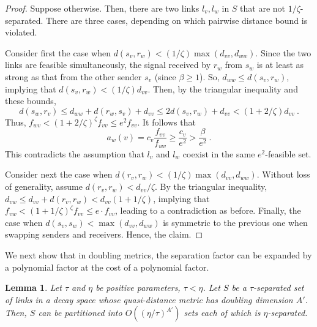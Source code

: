 \documentclass[11pt]{amsart}
\newtheorem{lemma}{Lemma}[section]
\begin{document}
\begin{proof}
Suppose otherwise. Then, there are two links $l_v,l_w$ in 
$S$ that are not $1/\zeta$-separated.
There are three cases, depending on which pairwise distance bound is violated.

Consider first the case when $d(s_v,r_w) < (1/\zeta)
\max(d_{vv},d_{ww})$.  Since the two links are feasible
simultaneously, the signal received by $r_w$ from $s_w$ is at least as
strong as that from the other sender $s_v$ (since $\beta \ge 1$).
So, $d_{ww} \le d(s_v,r_w)$, implying that 
$d(s_v,r_w) < (1/\zeta) d_{vv}$.
Then, by the triangular inequality and these bounds, 
\[ d(s_w,r_v) \le d_{ww} + d(r_w,s_v) + d_{vv} \le 2d(s_v,r_w)+d_{vv}
    < (1 + 2/\zeta)d_{vv}\ . \]
Thus, $f_{wv} < (1+2/\zeta)^\zeta f_{vv} \le e^2 f_{vv}$.
It follows that
 \[ a_w(v) = c_v \frac{f_{vv}}{f_{wv}} \ge \frac{c_v}{e^2} > \frac{\beta}{e^2}\ . \]
This contradicts the assumption that $l_v$ and $l_w$ coexist in the same $e^2$-feasible set.

Consider next the case when $d(r_v,r_w) < (1/\zeta) \max(d_{vv},d_{ww})$.
Without loss of generality, assume  $d(r_v,r_w) < d_{vv}/\zeta$.
By the triangular inequality,
$d_{vw} \le d_{vv} + d(r_v,r_w) < d_{vv}(1 + 1/\zeta)$, 
implying that $f_{vw} < (1+1/\zeta)^\zeta f_{vv} \le e \cdot f_{vv}$,
leading to a contradiction as before.
Finally, the case when $d(s_v,s_w) < \max(d_{vv},d_{ww})$ is symmetric to the
previous one when swapping senders and receivers.
Hence, the claim.
\end{proof}

We next show that in doubling metrics, the separation factor can be
expanded by a polynomial factor at the cost of a polynomial factor.

\begin{lemma}
Let $\tau$ and $\eta$ be positive parameters, $\tau < \eta$.
Let $S$ be a $\tau$-separated set of links 
in a decay space whose quasi-distance metric has doubling dimension $A'$.
Then, $S$ can be partitioned into $O((\eta/\tau)^{A'})$ sets each of which 
is $\eta$-separated.
\label{lem:sep-strength}
\end{lemma}
\end{document}
